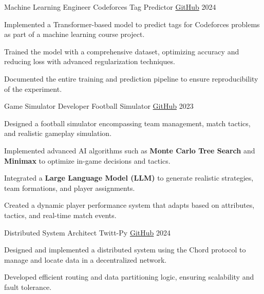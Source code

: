 \begin{cventries}
    \cventry
    {Machine Learning Engineer}
    {Codeforces Tag Predictor}
    {\href{https://github.com/alexsierra45/codeforce-tag-predictor}{GitHub}}
    {2024}
    {
      \begin{cvitems}
        \item {Implemented a Transformer-based model to predict tags for Codeforces problems as part of a machine learning course project.}
        \item {Trained the model with a comprehensive dataset, optimizing accuracy and reducing loss with advanced regularization techniques.}
        \item {Documented the entire training and prediction pipeline to ensure reproducibility of the experiment.}
      \end{cvitems}
    }
    \cventry
    {Game Simulator Developer}
    {Football Simulator}
    {\href{https://github.com/alexsierra45/football-simulator}{GitHub}}
    {2023}
    {
      \begin{cvitems}
        \item {Designed a football simulator encompassing team management, match tactics, and realistic gameplay simulation.}
        \item {Implemented advanced AI algorithms such as \textbf{Monte Carlo Tree Search} and \textbf{Minimax} to optimize in-game decisions and tactics.}
        \item {Integrated a \textbf{Large Language Model (LLM)} to generate realistic strategies, team formations, and player assignments.}
        \item {Created a dynamic player performance system that adapts based on attributes, tactics, and real-time match events.}
      \end{cvitems}
    }
    \cventry
    {Distributed System Architect}
    {Twitt-Py}
    {\href{https://github.com/alexsierra45/twitt-py}{GitHub}}
    {2024}
    {
      \begin{cvitems}
        \item {Designed and implemented a distributed system using the Chord protocol to manage and locate data in a decentralized network.}
        \item {Developed efficient routing and data partitioning logic, ensuring scalability and fault tolerance.}

\end{cvitems}}
\end{cventries}
